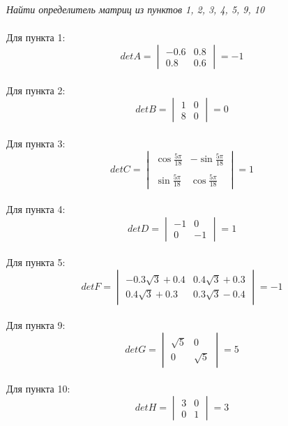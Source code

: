 \documentclass[a5paper, 10pt]{article}
\theoremstyle{definition}
\theoremstyle{plain}
\theoremstyle{remark}
\begin{document}
\subsection{}
\textit{Найти определитель матриц из пунктов 1, 2, 3, 4, 5, 9, 10}\\
\\
Для пункта 1:
\begin{equation}
detA =
\begin{vmatrix}
-0.6 & 0.8\\
0.8 & 0.6
\end{vmatrix}
= -1 
\end{equation}
\\
Для пункта 2:
\begin{equation}
detB =
\begin{vmatrix}
1 & 0\\
8 & 0
\end{vmatrix}
= 0
\end{equation}
\\
Для пункта 3:
\begin{equation}
detC =
\begin{vmatrix}
\cos \frac{5\pi}{18} & -\sin \frac{5\pi}{18}\\
\\
\sin \frac{5\pi}{18} & \cos \frac{5\pi}{18}
\end{vmatrix}
= 1 
\end{equation}
\\
Для пункта 4:
\begin{equation}
detD =
\begin{vmatrix}
-1 & 0\\
0 & -1
\end{vmatrix}
= 1 
\end{equation}
\\
Для пункта 5:
\begin{equation}
detF =
\begin{vmatrix}
-0.3\sqrt{3} + 0.4 & 0.4\sqrt{3} + 0.3 \\
0.4\sqrt{3} + 0.3  & 0.3\sqrt{3} - 0.4 
\end{vmatrix}
= -1
\end{equation}
\\
Для пункта 9:
\begin{equation}
detG =
\begin{vmatrix}
\sqrt{5} & 0\\
0 & \sqrt{5}
\end{vmatrix}
= 5
\end{equation}
\\
Для пункта 10:
\begin{equation}
detH =
\begin{vmatrix}
3 & 0\\
0 & 1
\end{vmatrix}
= 3 
\end{equation}
\end{document}
